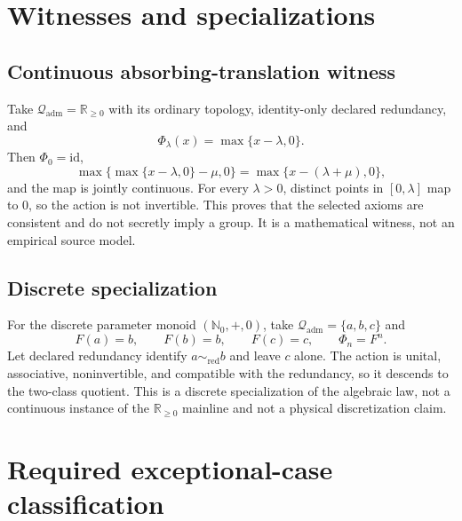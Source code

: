 \documentclass[11pt]{article}
\newcommand{\Qadm}{\mathcal Q_{\mathrm{adm}}}
\begin{document}
\section{Witnesses and specializations}

\subsection{Continuous absorbing-translation witness}

Take \(\Qadm=\mathbb R_{\geq0}\) with its ordinary topology, identity-only
declared redundancy, and
\[
  \Phi_\lambda(x)=\max\{x-\lambda,0\}.
\]
Then \(\Phi_0=\mathrm{id}\),
\[
 \max\{\max\{x-\lambda,0\}-\mu,0\}
 =\max\{x-(\lambda+\mu),0\},
\]
and the map is jointly continuous. For every \(\lambda>0\), distinct points
in \([0,\lambda]\) map to \(0\), so the action is not invertible. This proves
that the selected axioms are consistent and do not secretly imply a group.
It is a mathematical witness, not an empirical source model.

\subsection{Discrete specialization}

For the discrete parameter monoid \((\mathbb N_0,+,0)\), take
\(\Qadm=\{a,b,c\}\) and
\[
 F(a)=b,\qquad F(b)=b,\qquad F(c)=c,\qquad \Phi_n=F^n.
\]
Let declared redundancy identify \(a\sim_{\mathrm{red}}b\) and leave \(c\)
alone. The action is unital, associative, noninvertible, and compatible with
the redundancy, so it descends to the two-class quotient. This is a discrete
specialization of the algebraic law, not a continuous instance of the
\(\mathbb R_{\geq0}\) mainline and not a physical discretization claim.

\section{Required exceptional-case classification}
\end{document}
